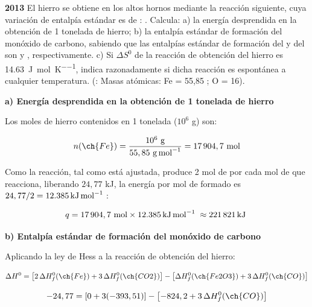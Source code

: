 \begin{exerciseEVAU}
    \textbf{2013} El hierro se obtiene en los altos hornos mediante la reacción siguiente, cuya variación de entalpía
    estándar es  de :  . Calcula: a) la energía desprendida en la obtención de 1 tonelada de hierro; b) la entalpía estándar de formación del monóxido de carbono, sabiendo que las entalpías estándar de formación del  y del  son  y , respectivamente. c) Si \(\Delta S^0\) de la reacción de obtención del hierro es \SI{14,63}{\joule\per\mole\per\kelvin}, indica razonadamente si dicha reacción es espontánea a cualquier temperatura. (\datos{}: Masas atómicas: Fe = 55,85 ; O = 16).

    \begin{solu}

        \textbf{a) Energía desprendida en la obtención de 1 tonelada de hierro}

        Los moles de hierro contenidos en 1 tonelada (\(10^6\) g) son:

        \begin{equation*}
            n(\ch{Fe}) = \dfrac{10^6 \ \si{\gram}}{55,85 \ \si{\gram\per\mole}} = 17\,904,7 \ \text{mol}
        \end{equation*}

        Como la reacción, tal como está ajustada, produce 2 mol de  por cada mol de  que reacciona, liberando \(24,77\) kJ, la energía por mol de  formado es \(24,77/2 = \energia[kjmol]{12.385}\):

        \begin{equation*}
            q = 17\,904,7 \ \text{mol} \times \energia[kjmol]{12.385} \approx \energia[kj]{221821}
        \end{equation*}

        \textbf{b) Entalpía estándar de formación del monóxido de carbono}

        Aplicando la ley de Hess a la reacción de obtención del hierro:

        \begin{equation*}
            \Delta H^0 = \left[ 2\, \Delta H^0_f (\ch{Fe}) + 3\, \Delta H^0_f (\ch{CO2}) \right] - \left[ \Delta H^0_f (\ch{Fe2O3}) + 3\, \Delta H^0_f (\ch{CO}) \right]
        \end{equation*}

        \begin{equation*}
            -24,77 = \left[ 0 + 3(-393,51) \right] - \left[ -824,2 + 3\, \Delta H^0_f (\ch{CO}) \right]
        \end{equation*}


\end{solu}
\end{exerciseEVAU}
